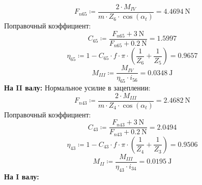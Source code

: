 \documentclass{article}
\newcommand{\defeq}{\coloneq} %
\begin{document}
\begin{equation*}
\textit{F}_{\textit{n65}} \defeq \frac{2 \cdot M_{IV}}{m \cdot \textit{Z}_{\textit{6}} \cdot \cos \left( α_{t} \right)} = {4.4694 \: \mathrm{N}}
\end{equation*}
\colorbox[HTML]{000000}{Поправочный коэффициент:}\newline
\begin{equation*}
\textit{C}_{\textit{65}} \defeq \frac{\textit{F}_{\textit{n65}}+3 \: \mathrm{N}}{\textit{F}_{\textit{n65}}+0.2 \: \mathrm{N}} = {1.5997}
\end{equation*}
\begin{equation*}
\textit{η}_{\textit{65}} \defeq 1-\textit{C}_{\textit{65}} \cdot f \cdot {\pi} \cdot \left( \frac{1}{\textit{Z}_{\textit{6}}}+\frac{1}{\textit{Z}_{\textit{5}}} \right) = {0.9657}
\end{equation*}
\begin{equation*}
M_{III} \defeq \frac{M_{IV}}{\textit{η}_{\textit{65}} \cdot \textit{i}_{\textit{56}}} = {0.0348 \: \mathrm{J}}
\end{equation*}
\colorbox[HTML]{000000}{\textbf{На II валу:}}\newline
\colorbox[HTML]{000000}{Нормальное усилие в зацеплении:}\newline
\begin{equation*}
\textit{F}_{\textit{n43}} \defeq \frac{2 \cdot M_{III}}{m \cdot \textit{Z}_{\textit{4}} \cdot \cos \left( α_{t} \right)} = {2.4682 \: \mathrm{N}}
\end{equation*}
\colorbox[HTML]{000000}{Поправочный коэффициент:}\newline
\begin{equation*}
\textit{C}_{\textit{43}} \defeq \frac{\textit{F}_{\textit{n43}}+3 \: \mathrm{N}}{\textit{F}_{\textit{n43}}+0.2 \: \mathrm{N}} = {2.0494}
\end{equation*}
\begin{equation*}
\textit{η}_{\textit{43}} \defeq 1-\textit{C}_{\textit{43}} \cdot f \cdot {\pi} \cdot \left( \frac{1}{\textit{Z}_{\textit{4}}}+\frac{1}{\textit{Z}_{\textit{3}}} \right) = {0.9506}
\end{equation*}
\begin{equation*}
M_{II} \defeq \frac{M_{III}}{\textit{η}_{\textit{43}} \cdot \textit{i}_{\textit{34}}} = {0.0195 \: \mathrm{J}}
\end{equation*}
\colorbox[HTML]{000000}{\textbf{На I валу:}}\newline
\end{document}
